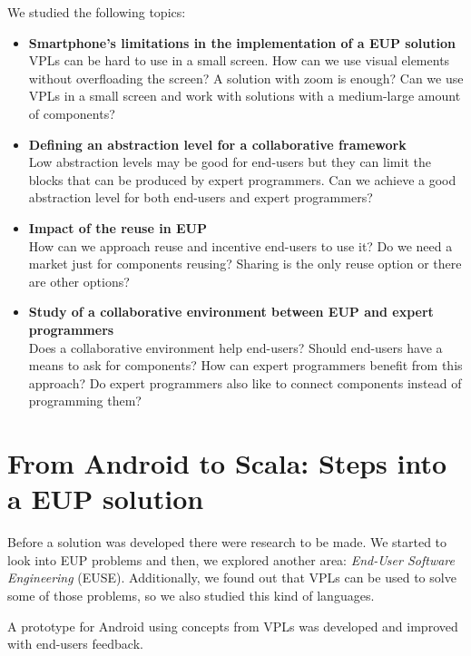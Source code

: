 \documentclass[9pt,a4paper]{extarticle}
\begin{document}
\begin{multicols}{2}
We studied the following topics: 

\begin{itemize}
	\item{\textbf{Smartphone's limitations in the implementation of a EUP solution} \\
    VPLs can be hard to use in a small screen. How can we use visual elements without overfloading the screen? A solution with zoom is enough?
	Can we use VPLs in a small screen and work with solutions with a medium-large amount of components?}
	
	\item{\textbf{Defining an abstraction level for a collaborative framework} \\
	Low abstraction levels may be good for end-users but they can limit the blocks that can be produced by expert programmers.
	Can we achieve a good abstraction level for both end-users and expert programmers?}
  
	\item{\textbf{Impact of the reuse in EUP} \\
    How can we approach reuse and incentive end-users to use it?
    Do we need a market just for components reusing? 
	Sharing is the only reuse option or there are other options?}
	
	\item{\textbf{Study of a collaborative environment between EUP and expert programmers} \\
    Does a collaborative environment help end-users? Should end-users have a means to ask for components? 
    How can expert programmers benefit from this approach? 
    Do expert programmers also like to connect components instead of programming them?}
\end{itemize}


\section{From Android to Scala: Steps into a EUP solution}\label{sec:work}

Before a solution was developed there were research to be made. We started to look into EUP problems \cite{Barriers2004} and then, we explored another area: \emph{End-User Software Engineering} (EUSE).
Additionally, we found out that VPLs can be used to solve some of those problems, so we also studied this kind of languages.

A prototype for Android using concepts from VPLs was developed and improved with end-users feedback. 


\end{multicols}
\end{document}
